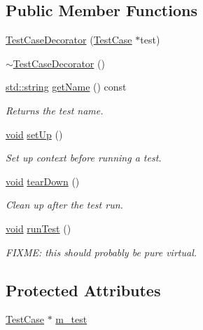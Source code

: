 \subsection*{Public Member Functions}
\begin{DoxyCompactItemize}
\item 
\hyperlink{class_test_case_decorator_ad324bf1dd0d660bae3eb5be8056e49e2}{Test\-Case\-Decorator} (\hyperlink{class_test_case}{Test\-Case} $\ast$test)
\item 
\hyperlink{class_test_case_decorator_a7a3e7d013ec9cdb28433e01b274924aa}{$\sim$\-Test\-Case\-Decorator} ()
\item 
\hyperlink{glew_8h_ae84541b4f3d8e1ea24ec0f466a8c568b}{std\-::string} \hyperlink{class_test_case_decorator_a5214bb812414958d39f084e09c8af207}{get\-Name} () const 
\begin{DoxyCompactList}\small\item\em Returns the test name. \end{DoxyCompactList}\item 
\hyperlink{wglew_8h_aeea6e3dfae3acf232096f57d2d57f084}{void} \hyperlink{class_test_case_decorator_ae379c8f3e6d411d8a5da57094c08a623}{set\-Up} ()
\begin{DoxyCompactList}\small\item\em Set up context before running a test. \end{DoxyCompactList}\item 
\hyperlink{wglew_8h_aeea6e3dfae3acf232096f57d2d57f084}{void} \hyperlink{class_test_case_decorator_adc3ee82fb758f39b5781624090af449d}{tear\-Down} ()
\begin{DoxyCompactList}\small\item\em Clean up after the test run. \end{DoxyCompactList}\item 
\hyperlink{wglew_8h_aeea6e3dfae3acf232096f57d2d57f084}{void} \hyperlink{class_test_case_decorator_ad083ca55ff2e7f1f3f442364aa1dde66}{run\-Test} ()
\begin{DoxyCompactList}\small\item\em F\-I\-X\-M\-E\-: this should probably be pure virtual. \end{DoxyCompactList}\end{DoxyCompactItemize}
\subsection*{Protected Attributes}
\begin{DoxyCompactItemize}
\item 
\hyperlink{class_test_case}{Test\-Case} $\ast$ \hyperlink{class_test_case_decorator_aac24fdb42563070ccad5575863e2a65e}{m\-\_\-test}
\end{DoxyCompactItemize}

